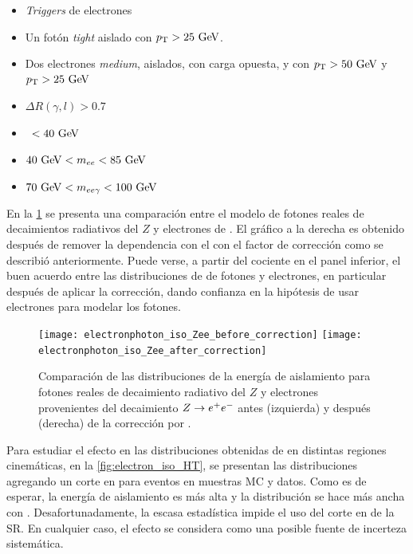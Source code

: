 \begin{itemize}\itemsep0.1cm
\item \emph{Triggers} de electrones %
\item Un fotón \emph{tight} aislado con $\pt>25 \gev$.
\item Dos electrones \emph{medium}, aislados, con carga opuesta, y con $\pt>50 \gev$ y $\pt>25 \gev$
\item $\Delta R(\gamma,l)>0.7$
\item \MET\ $<40\gev$
\item $40\gev<m_{ee}<85\gev$
\item $70\gev<m_{ee\gamma}<100\gev$
\end{itemize}

En la \cref{fig:photon_electron_iso} se presenta una comparación entre el modelo
de fotones reales de decaimientos radiativos del $Z$ y electrones de {\Zee}. El
gráfico a la derecha es obtenido después de remover la dependencia con el {\pt}
con el factor de corrección como se describió anteriormente. Puede verse, a partir
del cociente en el panel inferior,
el buen acuerdo entre las distribuciones de {\etiso} de fotones y
electrones, en particular después de aplicar la corrección, dando confianza en la
hipótesis de usar electrones para modelar los fotones.


\begin{figure}[!h]
  \centering

  \texttt{[image: electronphoton\_iso\_Zee\_before\_correction]}
  \texttt{[image: electronphoton\_iso\_Zee\_after\_correction]}

  \caption{Comparación de las distribuciones de la energía de aislamiento para fotones reales de
    decaimiento radiativo del $Z$ y electrones provenientes del decaimiento $Z \rightarrow e^+ e^-$ antes (izquierda)
    y después (derecha) de la corrección por \pt.}
    \label{fig:photon_electron_iso}

\end{figure}

Para estudiar el efecto en las distribuciones obtenidas de {\Zee} en distintas
regiones cinemáticas, en la \cref{fig:electron_iso_HT}, se presentan las
distribuciones agregando un corte en {\HT} para eventos {\Zee} en muestras MC y
datos. Como es de esperar, la energía de aislamiento es más alta y la
distribución se hace más ancha con \HT. Desafortunadamente, la escasa
estadística impide el uso del corte en {\HT} de la SR. En cualquier caso, el
efecto se considera como una posible fuente de incerteza sistemática.

